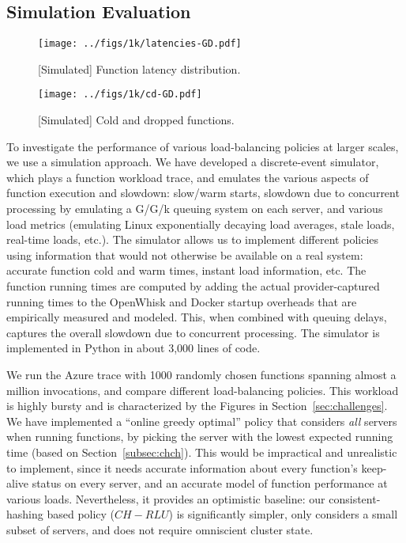 \vspace*{-0.3cm}
\subsection{Simulation Evaluation}
\label{subsec:eval-sim}


\begin{figure}
  \centering
  \texttt{[image: ../figs/1k/latencies-GD.pdf]}
  \vspace*{-0.3cm}
  \caption{[Simulated] Function latency distribution. }
  \label{fig:1k-lat}
  \vspace*{-0.3cm}
  
\end{figure}

\begin{figure}
  \centering
  \texttt{[image: ../figs/1k/cd-GD.pdf]}
    \vspace*{-0.3cm}
  \caption{[Simulated] Cold and dropped functions.}
  \label{fig:1k-cd}
    \vspace*{-0.3cm}
\end{figure}



To investigate the performance of various load-balancing policies at larger scales, we use a simulation approach.
We have developed a discrete-event simulator, which plays a function workload trace, and emulates the various aspects of function execution and slowdown: slow/warm starts, slowdown due to concurrent processing by emulating a G/G/k queuing system on each server, and various load metrics (emulating Linux exponentially decaying load averages, stale loads, real-time loads, etc.). 
The simulator allows us to implement different policies using information that would not otherwise be available on a real system: accurate function cold and warm times, instant load information, etc.
The function running times are computed by adding the actual provider-captured running times to the OpenWhisk and Docker startup overheads that are empirically measured and modeled.
This, when combined with queuing delays, captures the overall slowdown due to concurrent processing.
The simulator is implemented in Python in about 3,000 lines of code. 

We run the Azure trace with 1000 randomly chosen functions spanning almost a million invocations, and compare different load-balancing policies.
This workload is highly bursty and is characterized by the Figures in Section~\ref{sec:challenges}. 
We have implemented a ``online greedy optimal'' policy that considers \emph{all} servers when running functions, by picking the server with the lowest expected running time (based on Section~\ref{subsec:chch}).
This would be impractical and unrealistic to implement, since it needs accurate information about every function's keep-alive status on every server, and an accurate model of function performance at various loads.
Nevertheless, it provides an optimistic baseline: our consistent-hashing based policy ($CH-RLU$) is significantly simpler, only considers a small subset of servers, and does not require omniscient cluster state. 

